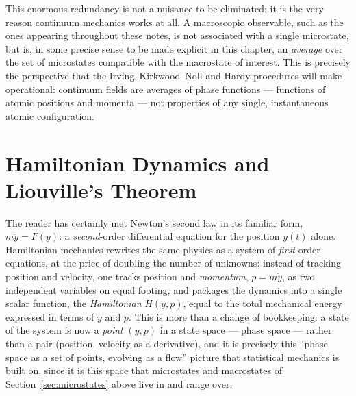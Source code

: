 \begin{remark}\label{rem:statmechprogramme}
	This enormous redundancy is not a nuisance to be eliminated; it is the very reason continuum mechanics works at all. A macroscopic observable, such as the ones appearing throughout these notes, is not associated with a single microstate, but is, in some precise sense to be made explicit in this chapter, an \textit{average} over the set of microstates compatible with the macrostate of interest. This is precisely the perspective that the Irving--Kirkwood--Noll and Hardy procedures will make operational: continuum fields are averages of phase functions --- functions of atomic positions and momenta --- not properties of any single, instantaneous atomic configuration.
\end{remark}

\section{Hamiltonian Dynamics and Liouville's Theorem}\label{sec:hamiltonian}

The reader has certainly met Newton's second law in its familiar form, $m\ddot y = F(y)$: a \textit{second}-order differential equation for the position $y(t)$ alone. Hamiltonian mechanics rewrites the same physics as a system of \textit{first}-order equations, at the price of doubling the number of unknowns: instead of tracking position and velocity, one tracks position and \textit{momentum}, $p=m\dot y$, as two independent variables on equal footing, and packages the dynamics into a single scalar function, the \textit{Hamiltonian} $H(y,p)$, equal to the total mechanical energy expressed in terms of $y$ and $p$. This is more than a change of bookkeeping: a state of the system is now a \textit{point} $(y,p)$ in a state space --- phase space --- rather than a pair (position, velocity-as-a-derivative), and it is precisely this ``phase space as a set of points, evolving as a flow'' picture that statistical mechanics is built on, since it is this space that microstates and macrostates of Section~\ref{sec:microstates} above live in and range over.

